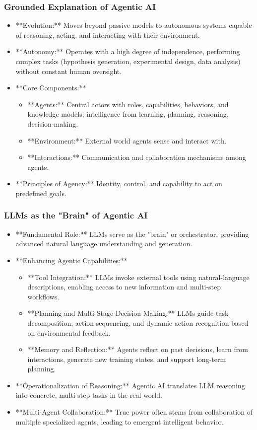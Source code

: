 \documentclass{beamer}       %
\begin{document}
\begin{frame}
    \frametitle{Grounded Explanation of Agentic AI}
    \tiny
    \begin{itemize}
        \item **Evolution:** Moves beyond passive models to autonomous systems capable of reasoning, acting, and interacting with their environment.
        \item **Autonomy:** Operates with a high degree of independence, performing complex tasks (hypothesis generation, experimental design, data analysis) without constant human oversight.
        \item **Core Components:**
        \begin{itemize}
            \tiny
            \item **Agents:** Central actors with roles, capabilities, behaviors, and knowledge models; intelligence from learning, planning, reasoning, decision-making.
            \item **Environment:** External world agents sense and interact with.
            \item **Interactions:** Communication and collaboration mechanisms among agents.
        \end{itemize}
        \item **Principles of Agency:** Identity, control, and capability to act on predefined goals.
    \end{itemize}
\end{frame}

\begin{frame}
    \frametitle{LLMs as the "Brain" of Agentic AI}
    \tiny
    \begin{itemize}
        \item **Fundamental Role:** LLMs serve as the "brain" or orchestrator, providing advanced natural language understanding and generation.
        \item **Enhancing Agentic Capabilities:**
        \begin{itemize}
            \tiny
            \item **Tool Integration:** LLMs invoke external tools using natural-language descriptions, enabling access to new information and multi-step workflows.
            \item **Planning and Multi-Stage Decision Making:** LLMs guide task decomposition, action sequencing, and dynamic action recognition based on environmental feedback.
            \item **Memory and Reflection:** Agents reflect on past decisions, learn from interactions, generate new training states, and support long-term planning.
        \end{itemize}
        \item **Operationalization of Reasoning:** Agentic AI translates LLM reasoning into concrete, multi-step tasks in the real world.
        \item **Multi-Agent Collaboration:** True power often stems from collaboration of multiple specialized agents, leading to emergent intelligent behavior.
    \end{itemize}
\end{frame}
\end{document}
